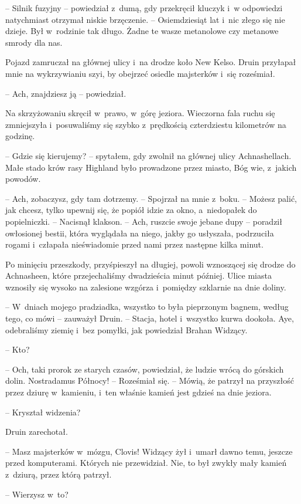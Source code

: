 \documentclass[oneside,polish,11pt,sfheadings]{mwbk}
\begin{document}
-- Silnik fuzyjny -- powiedział z~dumą, gdy przekręcił kluczyk i~w odpowiedzi natychmiast otrzymał niskie brzęczenie. -- Osiemdziesiąt lat i~nic złego się nie dzieje. Był w~rodzinie tak długo. Żadne te wasze
metanolowe czy metanowe smrody dla nas.

Pojazd zamruczał na głównej ulicy i~na drodze koło New Kelso. Druin
przyłapał mnie na wykrzywianiu szyi, by obejrzeć osiedle majsterków i~się roześmiał.

-- Ach, znajdziesz ją -- powiedział.

Na skrzyżowaniu skręcił w~prawo, w~górę jeziora. Wieczorna fala ruchu
się zmniejszyła i~posuwaliśmy się szybko z~prędkością czterdziestu
kilometrów na godzinę.

-- Gdzie się kierujemy? -- spytałem, gdy zwolnił na głównej ulicy
Achnashellach. Małe stado krów rasy Highland było prowadzone przez
miasto, Bóg wie, z~jakich powodów.

-- Ach, zobaczysz, gdy tam dotrzemy. -- Spojrzał na mnie z~boku. -- Możesz
palić, jak chcesz, tylko upewnij się, że popiół idzie za okno, a~niedopałek do popielniczki. -- Nacisnął klakson. -- Ach, ruszcie swoje
jebane dupy -- poradził owłosionej bestii, która wyglądała na niego,
jakby go usłyszała, podrzuciła rogami i~człapała nieświadomie przed nami
przez następne kilka minut.

Po minięciu przeszkody, przyśpieszył na długiej, powoli wznoszącej się
drodze do Achnasheen, które przejechaliśmy dwadzieścia minut później.
Ulice miasta wznosiły się wysoko na zalesione wzgórza i~pomiędzy
szklarnie na dnie doliny.

-- W~dniach mojego pradziadka, wszystko to była pieprzonym bagnem, według
tego, co mówi -- zauważył Druin. -- Stacja, hotel i~wszystko kurwa
dookoła. Aye, odebraliśmy ziemię i~bez pomyłki, jak powiedział Brahan
Widzący.

-- Kto?

-- Och, taki prorok ze starych czasów, powiedział, że ludzie wrócą do
górskich dolin. Nostradamus Północy! -- Roześmiał się. -- Mówią, że
patrzył na przyszłość przez dziurę w~kamieniu, i~ten właśnie kamień jest
gdzieś na dnie jeziora.

-- Kryształ widzenia?

Druin zarechotał. 

-- Masz majsterków w~mózgu, Clovis! Widzący żył i~umarł
dawno temu, jeszcze przed komputerami. Których nie przewidział. Nie, to
był zwykły mały kamień z~dziurą, przez którą patrzył.

-- Wierzysz w~to?
\end{document}
